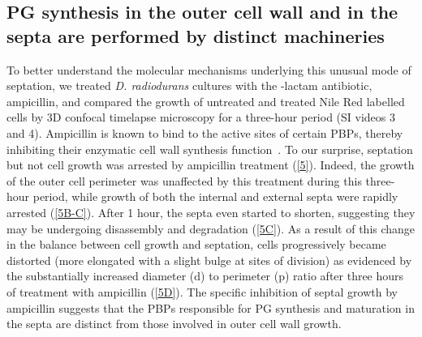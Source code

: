 \subsection{PG synthesis in the outer cell wall and in the septa are performed by distinct machineries}

To better understand the molecular mechanisms underlying this unusual mode of septation, we treated \textit{D. radiodurans} cultures with the \beta-lactam antibiotic, ampicillin, and compared the growth of untreated and treated Nile Red labelled cells by 3D confocal timelapse microscopy for a three-hour period (SI videos 3 and 4).
Ampicillin is known to bind to the active sites of certain PBPs, thereby inhibiting their enzymatic cell wall synthesis function~\cite{sauvageGlycosyltransferasesTranspeptidasesPenicillinBinding2016}.
To our surprise, septation but not cell growth was arrested by ampicillin treatment (\autoref{5}).
Indeed, the growth of the outer cell perimeter was unaffected by this treatment during this three-hour period, while growth of both the internal and external septa were rapidly arrested (\autoref{5B-C}).
After 1 hour, the septa even started to shorten, suggesting they may be undergoing disassembly and degradation (\autoref{5C}).
As a result of this change in the balance between cell growth and septation, cells progressively became distorted (more elongated with a slight bulge at sites of division) as evidenced by the substantially increased diameter (d) to perimeter (p) ratio after three hours of treatment with ampicillin (\autoref{5D}).
The specific inhibition of septal growth by ampicillin suggests that the PBPs responsible for PG synthesis and maturation in the septa are distinct from those involved in outer cell wall growth.

